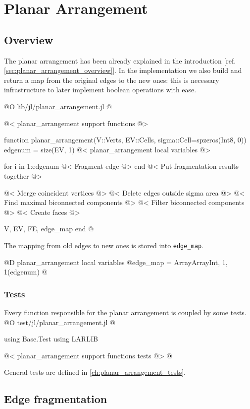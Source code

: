 \chapter{Planar Arrangement}
\label{ch:planar_arrangement}

\section{Overview}
\label{sec:planar_arrangement_intro}

The planar arrangement has been already explained in the introduction
[ref. \ref{sec:planar_arrangement_overview}]. In the implementation 
we also build and return a map from the original
edges to the new ones: this is necessary infrastructure to later implement
boolean operations with ease.

@O lib/jl/planar_arrangement.jl
@{@< planar\_arrangement support functions @>

function planar_arrangement(V::Verts, EV::Cells, sigma::Cell=spzeros(Int8, 0))
    edgenum = size(EV, 1)
    @< planar\_arrangement local variables @>

    for i in 1:edgenum
        @< Fragment edge @>
    end
    @< Put fragmentation results together @>

    @< Merge coincident vertices @>
    @< Delete edges outside sigma area @>
    @< Find maximal biconnected components @>
    @< Filter biconnected components @>
    @< Create faces @>  

    V, EV, FE, edge_map
end 
@}

The mapping from old edges to new ones is stored into \texttt{edge\_map}.

@D planar\_arrangement local variables
@{edge_map = Array{Array{Int, 1}, 1}(edgenum)
@}
\subsection{Tests}
Every function responsible for the planar arrangement is coupled by some tests. 
@O test/jl/planar_arrangement.jl
@{using Base.Test
using LARLIB

@< planar\_arrangement support functions tests @>
@}
General tests are defined in \ref{ch:planar_arrangement_tests}.










\section{Edge fragmentation}
